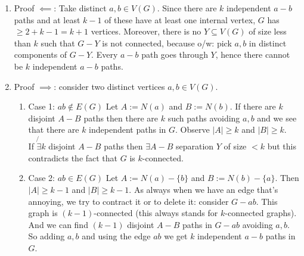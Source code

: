 		\begin{enumerate}
			\item Proof $\impliedby$: Take distinct $a ,b \in V(G)$. Since there are $k$ independent $a-b$ paths and at least $k-1$ of these have at least one internal vertex, $G$ has $\geq 2 + k - 1 = k + 1$ vertices. Moreover, there is no $Y \subseteq V(G)$ of size less than $k$ such that $G - Y$ is not connected, because o/w: pick $a,b$ in distinct components of $G - Y$. Every $a-b$ path goes through $Y$, hence there cannot be $k$ independent $a-b$ paths.
			\item Proof $\implies$: consider two distinct vertices $a,b \in V(G)$. 
		\begin{enumerate}
		\item{Case 1: $ab \notin E(G)$}
		Let $A := N(a)$ and $B := N(b)$.
		If there are $k$ disjoint $A-B$ paths then there are $k$ such paths avoiding $a,b$ and we see that there are $k$ independent paths in $G$.  Observe $|A| \geq k$ and $|B| \geq k$.\\
		
		If $\not{\exists} k$ disjoint $A-B$ paths then $\exists A-B$ separation $Y$ of size $< k$ but this contradicts the fact that $G$ is $k$-connected.
		
		\item{Case 2: $ab \in E(G)$}
		Let $A := N(a) - \{b\}$ and $B := N(b) - \{a\}$. Then $|A| \geq k -1$ and $|B| \geq k - 1$. As always when we have an edge that's annoying, we try to contract it or to delete it:  consider  $G - ab$. This graph is $(k-1)$-connected (this always stands for $k$-connected graphs). And we can find $(k-1)$ disjoint $A-B$ paths in $G - ab$ avoiding $a,b$. So adding $a,b$ and using the edge $ab$ we get $k$ independent $a-b$ paths in $G$. 
		\end{enumerate} 
		\end{enumerate}
